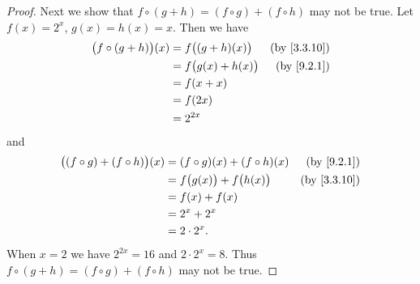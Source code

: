 \begin{proof}
  Next we show that \(f \circ (g + h) = (f \circ g) + (f \circ h)\) may not be true.
  Let \(f(x) = 2^x\), \(g(x) = h(x) = x\).
  Then we have
  \begin{align*}
    \big(f \circ (g + h)\big)(x) & = f\big((g + h)(x)\big)  & \text{(by \cref{3.3.10})} \\
                                 & = f\big(g(x) + h(x)\big) & \text{(by \cref{9.2.1})}  \\
                                 & = f(x + x)                                           \\
                                 & = f(2x)                                              \\
                                 & = 2^{2x}
  \end{align*}
  and
  \begin{align*}
    \big((f \circ g) + (f \circ h)\big)(x) & = (f \circ g)(x) + (f \circ h)(x)   & \text{(by \cref{9.2.1})}  \\
                                           & = f\big(g(x)\big) + f\big(h(x)\big) & \text{(by \cref{3.3.10})} \\
                                           & = f(x) + f(x)                                                   \\
                                           & = 2^x + 2^x                                                     \\
                                           & = 2 \cdot 2^x.
  \end{align*}
  When \(x = 2\) we have \(2^{2x} = 16\) and \(2 \cdot 2^x = 8\).
  Thus \(f \circ (g + h) = (f \circ g) + (f \circ h)\) may not be true.


\end{proof}
